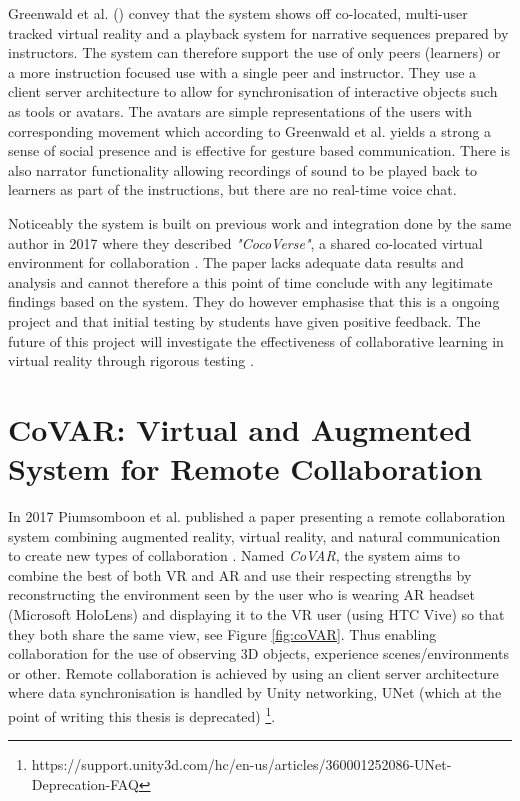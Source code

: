 Greenwald et al. (\citeyear{greenwald2019electrovr}) convey that the system shows off co-located, multi-user tracked virtual reality and a playback system for narrative sequences prepared by instructors. The system can therefore support the use of only peers (learners) or a more instruction focused use with a single peer and instructor. They use a client server architecture to allow for synchronisation of interactive objects such as tools or avatars. The avatars are simple representations of the users with corresponding movement which according to  Greenwald et al. \cite{greenwald2017investigating} yields a strong a sense of social presence and is effective for gesture based communication. There is also narrator functionality allowing recordings of sound to be played back to learners as part of the instructions, but there are no real-time voice chat.

Noticeably the system is built on previous work and integration done by the same author in 2017 where they described \textit{"CocoVerse"}, a shared co-located virtual environment for collaboration \cite{greenwald2017multi}. The paper lacks adequate data results and analysis and cannot therefore a this point of time conclude with any legitimate findings based on the system. They do however emphasise that this is a ongoing project and that initial testing by students have given positive feedback. The future of this project will investigate the effectiveness of collaborative learning in virtual reality through rigorous testing \cite{greenwald2019electrovr}.  





\section{CoVAR: Virtual and Augmented System for Remote Collaboration}
\label{sec:coVAR}
In 2017 Piumsomboon et al. published a paper presenting a remote collaboration system combining augmented reality, virtual reality, and natural communication to create new types of collaboration \cite{piumsomboon2017covar}. Named \textit{CoVAR}, the system aims to combine the best of both VR and AR and use their respecting strengths by reconstructing the environment seen by the user who is wearing AR headset (Microsoft HoloLens) and displaying it to the VR user (using HTC Vive) so that they both share the same view, see Figure \ref{fig:coVAR}. Thus enabling collaboration for the use of observing 3D objects, experience scenes/environments or other. Remote collaboration is achieved by using an client server architecture where data synchronisation is handled by Unity networking, UNet (which at the point of writing this thesis is deprecated) \footnote{https://support.unity3d.com/hc/en-us/articles/360001252086-UNet-Deprecation-FAQ}.


